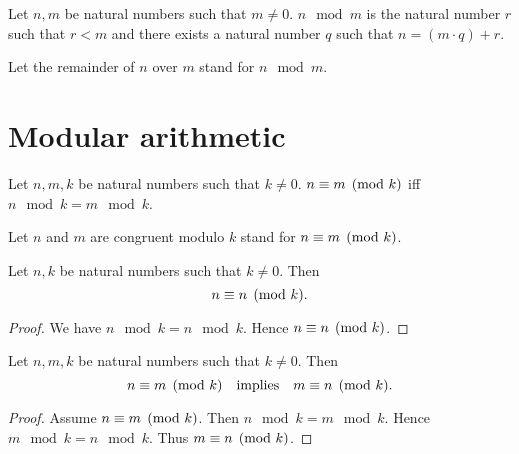 \documentclass[../arithmetic.tex]{subfiles}
\begin{document}
  \begin{forthel}
    \begin{definition}
      Let $n, m$ be natural numbers such that $m \neq 0$.
      $n \mod m$ is the natural number $r$ such that $r \less m$ and there exists a
      natural number $q$ such that $n = (m \cdot q) \plus r$.
    \end{definition}

    Let the remainder of $n$ over $m$ stand for $n \mod m$.
  \end{forthel}


  \section{Modular arithmetic}

  \begin{forthel}
    \begin{definition}
      Let $n, m, k$ be natural numbers such that $k \neq 0$.
      $n\equiv m\pmod{k}$ iff $n \mod k = m \mod k$.
    \end{definition}

    Let $n$ and $m$ are congruent modulo $k$ stand for $n\equiv m\pmod{k}$.
  \end{forthel}

  \begin{forthel}
    \begin{proposition}
      Let $n, k$ be natural numbers such that $k \neq 0$.
      Then \[ n\equiv n\pmod{k}. \]
    \end{proposition}
    \begin{proof}
      We have $n \mod k = n \mod k$.
      Hence $n\equiv n\pmod{k}$.
    \end{proof}
  \end{forthel}

  \begin{forthel}
    \begin{proposition}
      Let $n, m, k$ be natural numbers such that $k \neq 0$.
      Then \[ n\equiv m\pmod{k} \quad \text{implies} \quad m\equiv n\pmod{k}. \]
    \end{proposition}
    \begin{proof}
      Assume $n\equiv m\pmod{k}$.
      Then $n \mod k = m \mod k$.
      Hence $m \mod k = n \mod k$.
      Thus $m\equiv n\pmod{k}$.
    \end{proof}
  \end{forthel}
\end{document}
